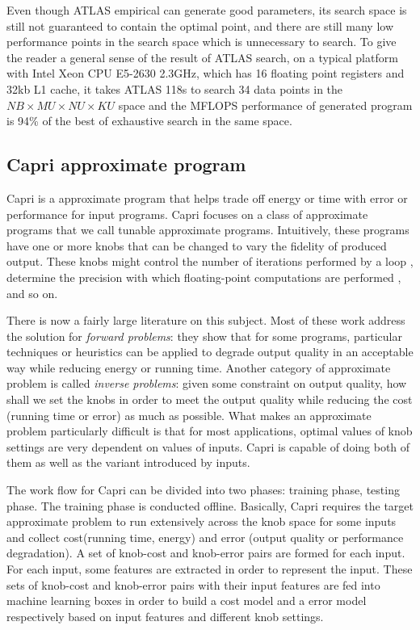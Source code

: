   Even though ATLAS empirical can generate good parameters, its search space is still not guaranteed to contain
  the optimal point, and there are still many low performance points in the search space which is unnecessary
  to search. To give the reader a general sense of the result of ATLAS search, on a typical platform with Intel Xeon 
  CPU E5-2630 2.3GHz, which has 16 floating point registers and 32kb L1 cache, it takes ATLAS 118s to search 34 data 
  points in the $NB\times MU \times NU \times KU$ space and the MFLOPS performance of generated program is 94\% of the 
  best of exhaustive search in the same space. 


  \subsection{Capri approximate program}
  \label{sec:Capri_intro}
  Capri is a approximate program that helps trade off energy or time with error
  or performance for input programs. Capri focuses on a class of approximate
  programs that we call tunable approximate programs. Intuitively, these
  programs have one or more knobs that can be changed to vary the fidelity of
  produced output. These knobs might control the number of iterations performed
  by a loop \cite{bottou2010large, rinard2007using}, determine the precision with which floating-point
  computations are performed \cite{rubio2013precimonious, schkufza2014stochastic}, and so on.

  There is now a fairly large literature on this subject. Most of these work
  address the solution for \emph{forward problems}: they show that for some
  programs, particular techniques or heuristics can be applied to degrade
  output quality in an acceptable way while reducing energy or running time.
  Another category of approximate problem is called \emph{
  inverse problems}: given some constraint on output quality, how shall we set
  the knobs in order to meet the output quality while reducing the cost (running
  time or error) as much as possible. What makes an approximate problem
  particularly difficult is that for most applications, optimal values of
  knob settings are very dependent on values of inputs. Capri is capable of
  doing both of them as well as the variant introduced by inputs.

  The work flow for Capri can be divided into two phases: training
  phase, testing phase. The training phase is conducted
  offline. Basically, Capri requires the target approximate problem to run
  extensively across the knob space for some inputs and collect cost(running
  time, energy) and error (output quality or performance degradation). A set of
  knob-cost and knob-error pairs are formed for each input. For each input, some
  features are extracted in order to represent the input. These sets of
  knob-cost and knob-error pairs with their input features are fed into
  machine learning boxes in order to build a cost model and a error model
  respectively based on input features and different knob settings.

